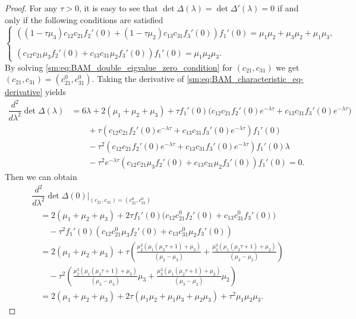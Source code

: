\begin{proof}
For any $\tau>0$, it is easy to see that $\det\Delta(\lambda)=\det\Delta'(\lambda)=0$
if and only if the following conditions are satisfied
\begin{equation}
\begin{cases}
\left((1-\tau\mu_{3})c_{12}c_{21}f_{2}'(0)+(1-\tau\mu_{2})c_{13}c_{31}f_{3}'(0)\right)f_{1}'(0)=\mu_{1}\mu_{2}+\mu_{3}\mu_{2}+\mu_{1}\mu_{3},\\
\\
\left(c_{12}c_{21}\mu_{3}f_{2}'(0)+c_{13}c_{31}\mu_{2}f_{3}'(0)\right)f_{1}'(0)=\mu_{1}\mu_{2}\mu_{3}.
\end{cases}\label{sm:eq:BAM_double_eigvalue_zero_condition}
\end{equation}
By solving \cref{sm:eq:BAM_double_eigvalue_zero_condition} for $(c_{21},c_{31})$
we get $(c_{21},c_{31})=(c_{21}^{0},c_{31}^{0})$.
Taking the derivative of \cref{sm:eq:BAM_characteristic_eq-derivative}
yields
\begin{align}
\dfrac{d^{2}}{d\lambda^{2}}\det\Delta(\lambda) & =6\lambda+2\left(\mu_{1}+\mu_{2}+\mu_{3}\right)+\tau f_{1}'(0)\big(c_{12}c_{21}f_{2}'(0)e^{-\lambda\tau}+c_{13}c_{31}f_{3}'(0)e^{-\lambda\tau}\big)\nonumber \\
 & \qquad+\tau\left(c_{12}c_{21}f_{2}'(0)e^{-\lambda\tau}+c_{13}c_{31}f_{3}'(0)e^{-\lambda\tau}\right)f_{1}'(0)\nonumber \\
 & \qquad-\tau^{2}\left(c_{12}c_{21}f_{2}'(0)e^{-\lambda\tau}+c_{13}c_{31}f_{3}'(0)e^{-\lambda\tau}\right)f_{1}'(0)\lambda\nonumber \\
 & \qquad-\tau^{2}e^{-\lambda\tau}\left(c_{12}c_{21}\mu_{3}f_{2}'(0)+c_{13}c_{31}\mu_{2}f_{3}'(0)\right)f_{1}'(0)=0.\label{sm:eq:BAM_characteristic_eq-derivative-1}
\end{align}
Then we can obtain
\begin{align*}
 & \dfrac{d^{2}}{d\lambda^{2}}\det\Delta(0)\vert_{(c_{21},c_{31})=(c_{21}^{0},c_{31}^{0})}\\
 & \quad=2\left(\mu_{1}+\mu_{2}+\mu_{3}\right)+2\tau f_{1}'(0)\big(c_{12}c_{21}^{0}f_{2}'(0)+c_{13}c_{31}^{0}f_{3}'(0)\big)\\
 & \qquad-\tau^{2}f_{1}'(0)\left(c_{12}c_{21}^{0}\mu_{3}f_{2}'(0)+c_{13}c_{31}^{0}\mu_{2}f_{3}'(0)\right)\\
 & \quad=2\left(\mu_{1}+\mu_{2}+\mu_{3}\right)+\tau\left(\frac{\mu_{2}^{2}\left(\mu_{1}\left(\mu_{3}\tau+1\right)+\mu_{3}\right)}{\left(\mu_{2}-\mu_{3}\right)}+\frac{\mu_{3}^{2}\left(\mu_{1}\left(\mu_{2}\tau+1\right)+\mu_{2}\right)}{\left(\mu_{3}-\mu_{2}\right)}\right)\\
 & \qquad-\tau^{2}\left(\frac{\mu_{2}^{2}\left(\mu_{1}\left(\mu_{3}\tau+1\right)+\mu_{3}\right)}{\left(\mu_{2}-\mu_{3}\right)}\mu_{3}+\frac{\mu_{3}^{2}\left(\mu_{1}\left(\mu_{2}\tau+1\right)+\mu_{2}\right)}{\left(\mu_{3}-\mu_{2}\right)}\mu_{2}\right)\\
 & \quad=2\left(\mu_{1}+\mu_{2}+\mu_{3}\right)+2\tau\left(\mu_{1}\mu_{2}+\mu_{1}\mu_{3}+\mu_{2}\mu_{3}\right)+\tau^{2}\mu_{1}\mu_{2}\mu_{3}.
\end{align*}


\end{proof}
